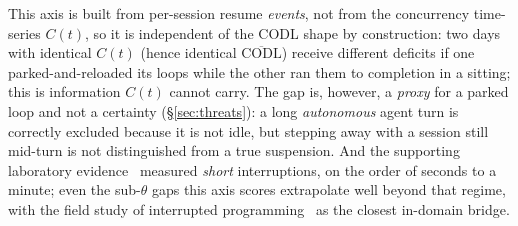 \documentclass[10pt,twocolumn]{article}
\begin{document}
This axis is built from per-session resume \emph{events}, not from the concurrency
time-series $C(t)$, so it is independent of the CODL shape by construction: two
days with identical $C(t)$ (hence identical $\overline{\mathrm{CODL}}$) receive
different deficits if one parked-and-reloaded its loops while the other ran them to
completion in a sitting; this is information $C(t)$ cannot carry. The gap is, however,
a \emph{proxy} for a
parked loop and not a certainty (\S\ref{sec:threats}): a long \emph{autonomous}
agent turn is correctly excluded because it is not idle, but stepping away with a
session still mid-turn is not distinguished from a true suspension. And the
supporting laboratory evidence~\cite{monk2008,altmann2002} measured \emph{short}
interruptions, on the order of seconds to a minute; even the sub-$\theta$ gaps
this axis scores extrapolate well beyond that regime, with the field study of
interrupted programming~\cite{parnin2011} as the closest in-domain bridge.
\end{document}
